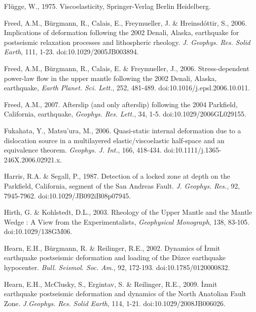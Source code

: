 \documentclass[extra]{gji}
\begin{document}
\begin{thebibliography}{}
 Fl\"ugge,
  W., 1975. Viscoelasticity, Springer-Verlag Berlin Heidelberg.

 Freed, A.M., B\"urgmann,
  R., Calais, E., Freymueller, J. \& Hreinsd\'ottir, S.,
  2006. Implications of deformation following the 2002 Denali, Alaska,
  earthquake for postseismic relaxation processes and lithospheric
  rheology. \textit{J. Geophys. Res. Solid Earth}, 111,
  1-23. doi:10.1029/2005JB003894.

 Freed, A.M.,
  B\"urgmann, R., Calais, E. \& Freymueller, J.,
  2006. Stress-dependent power-law flow in the upper mantle following
  the 2002 Denali, Alaska, earthquake, \textit{Earth
    Planet. Sci. Lett.}, 252, 481-489. doi:10.1016/j.epsl.2006.10.011.

 Freed, A.M., 2007. Afterslip
  (and only afterslip) following the 2004 Parkfield, California,
  earthquake, \textit{Geophys. Res. Lett.}, 34,
  1-5. doi:10.1029/2006GL029155.

 Fukahata, Y.,
  Matsu’ura, M., 2006. Quasi-static internal deformation due to a
  dislocation source in a multilayered elastic/viscoelastic half-space
  and an equivalence theorem. \textit{Geophys. J. Int.}, 166,
  418-434. doi:10.1111/j.1365-246X.2006.02921.x.

 Harris, R.A. \&
  Segall, P., 1987. Detection of a locked zone at depth on the
  Parkfield, California, segment of the San Andreas
  Fault. \textit{J. Geophys. Res.}, 92,
  7945-7962. doi:10.1029/JB092iB08p07945.

 Hirth, G. \& Kohlstedt,
  D.L., 2003. Rheology of the Upper Mantle and the Mantle Wedge : A
  View from the Experimentalists, \textit{Geophysical Monograph}, 138,
  83-105. doi:10.1029/138GM06.

 Hearn, E.H., B\"urgmann, R. \&
  Reilinger, R.E., 2002. Dynamics of \.Izmit earthquake postseismic
  deformation and loading of the D\"uzce earthquake
  hypocenter. \textit{Bull.  Seismol. Soc. Am.}, 92,
  172-193. doi:10.1785/0120000832.

 Hearn, E.H., McClusky, S.,
  Ergintav, S. \& Reilinger, R.E., 2009. \.Izmit earthquake
  postseismic deformation and dynamics of the North Anatolian Fault
  Zone. \textit{J.Geophys. Res. Solid Earth}, 114,
  1-21. doi:10.1029/2008JB006026.


\end{thebibliography}
\end{document}
